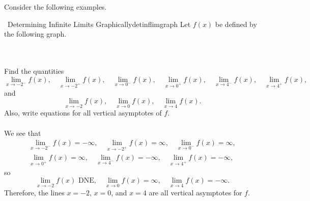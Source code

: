         \pagebreak
        \vphantom
        \\
        \\
        Consider the following examples.
        \begin{example}{\Difficulty\,\Difficulty\,\,Determining Infinite Limits Graphically}{detinflimgraph}
            Let \(f(x)\) be defined by the following graph.
            \begin{center}
            \end{center}
            \vphantom
            \\
            \\
            Find the quantities
            \begin{equation*}
                \lim_{x\to -2^-}f(x),\quad \lim_{x\to -2^+}f(x),\quad \lim_{x\to 0^-}f(x),\quad \lim_{x\to 0^+}f(x),\quad \lim_{x\to 4^-}f(x),\quad \lim_{x\to 4^+}f(x),
            \end{equation*}
            and
            \begin{equation*}
                \lim_{x\to -2}f(x),\quad \lim_{x\to 0}f(x),\quad \lim_{x\to 4}f(x).
            \end{equation*}
            Also, write equations for all vertical asymptotes of \(f\).
            \\
            \\
            We see that
            \begin{align*}
                \lim_{x\to -2^-}f(x)=-\infty,\quad \lim_{x\to -2^+}f(x)=\infty,\quad \lim_{x\to 0^-}f(x)=\infty, \\ \lim_{x\to 0^+}f(x)=\infty,\quad \lim_{x\to 4^-}f(x)=-\infty,\quad \lim_{x\to 4^+}f(x)=-\infty,
            \end{align*}
            so
            \begin{equation*}
                \lim_{x\to -2}f(x)\text{ DNE},\quad \lim_{x\to 0}f(x)=\infty,\quad \lim_{x\to 4}f(x)=-\infty.
            \end{equation*}
            Therefore, the lines \(x=-2\), \(x=0\), and \(x=4\) are all vertical asymptotes for \(f\).
        \end{example}
